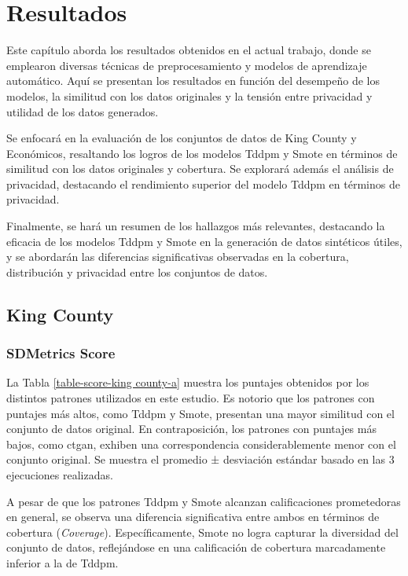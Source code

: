 \chapter{Resultados}
\label{chap:resultados}
Este capítulo aborda los resultados obtenidos en el actual trabajo, donde se emplearon diversas técnicas de preprocesamiento y modelos de aprendizaje automático. Aquí se presentan los resultados en función del desempeño de los modelos, la similitud con los datos originales y la tensión entre privacidad y utilidad de los datos generados.

Se enfocará en la evaluación de los conjuntos de datos de King County y Económicos, resaltando los logros de los modelos Tddpm y Smote en términos de similitud con los datos originales y cobertura. Se explorará además el análisis de privacidad, destacando el rendimiento superior del modelo Tddpm en términos de privacidad.

Finalmente, se hará un resumen de los hallazgos más relevantes, destacando la eficacia de los modelos Tddpm y Smote en la generación de datos sintéticos útiles, y se abordarán las diferencias significativas observadas en la cobertura, distribución y privacidad entre los conjuntos de datos.

\newpage
\section{King County}
\subsection{SDMetrics Score}
\label{metric-kingcounty}
La Tabla \ref{table-score-king county-a} muestra los puntajes obtenidos por los distintos patrones utilizados en este estudio. Es notorio que los patrones con puntajes más altos, como Tddpm y Smote, presentan una mayor similitud con el conjunto de datos original. En contraposición, los patrones con puntajes más bajos, como ctgan, exhiben una correspondencia considerablemente menor con el conjunto original. Se muestra el promedio ± desviación estándar basado en las 3 ejecuciones realizadas.

    
A pesar de que los patrones Tddpm y Smote alcanzan calificaciones prometedoras en general, se observa una diferencia significativa entre ambos en términos de cobertura (\emph{Coverage}). Específicamente, Smote no logra capturar la diversidad del conjunto de datos, reflejándose en una calificación de cobertura marcadamente inferior a la de Tddpm.

